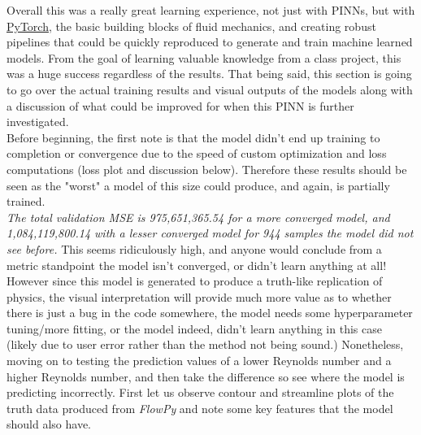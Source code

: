 \documentclass{article}
\begin{document}
Overall this was a really great learning experience, not just with
PINNs, but with \href{https://pytorch.org/}{PyTorch}, the basic building blocks
of fluid mechanics,
and creating robust pipelines that could be quickly reproduced to
generate and train machine learned models. From the goal of learning valuable
knowledge from a class project, this was a huge success regardless of the
results. That being said, this section is going to go over the actual training
results and visual outputs of the models along with a discussion of what could
be improved for when this PINN is further investigated. \\

\noindent Before beginning, the first note is that the model didn't end
up training to completion or convergence due to the speed of custom
optimization and loss computations (loss plot and discussion below). Therefore
these results should be seen as the "worst" a model of this size could produce,
and again, is partially trained. \\

\noindent \textit{The total validation MSE is 975,651,365.54 for a more
	converged model, and 1,084,119,800.14 with a lesser converged model for
	944
	samples the model did not see before.} This seems ridiculously high,
and anyone
would conclude from a metric standpoint the model isn't converged, or didn't
learn anything at all! However since this model is generated to produce a
truth-like replication of physics, the visual interpretation will provide much
more value as to whether there is just a bug in the code somewhere, the model
needs some hyperparameter tuning/more fitting, or the model indeed, didn't
learn anything in this case (likely due to user error rather than the method
not being sound.) Nonetheless, moving on to testing the prediction values of a
lower Reynolds number and a higher Reynolds number, and then take the
difference so see where the model is predicting incorrectly. First let us
observe contour and streamline plots of the truth data produced from
\textit{FlowPy} and note some key features that the model should also have.
\end{document}
